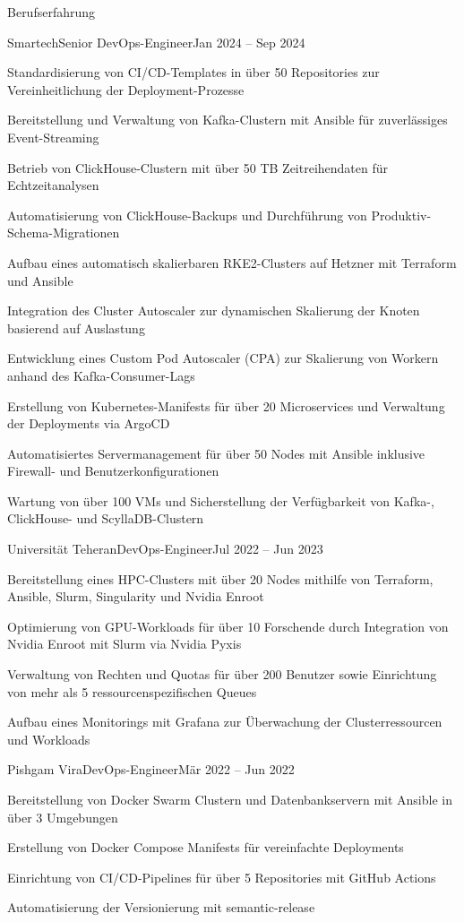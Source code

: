 \documentclass[]{main}
\begin{document}
\begin{section}{Berufserfahrung}
 \begin{subsection}{Smartech}{Senior DevOps-Engineer}{Jan 2024 -- Sep 2024}{}
     \item Standardisierung von CI/CD-Templates in über 50 Repositories zur Vereinheitlichung der Deployment-Prozesse
     \item Bereitstellung und Verwaltung von Kafka-Clustern mit Ansible für zuverlässiges Event-Streaming
     \item Betrieb von ClickHouse-Clustern mit über 50 TB Zeitreihendaten für Echtzeitanalysen
     \item Automatisierung von ClickHouse-Backups und Durchführung von Produktiv-Schema-Migrationen
     \item Aufbau eines automatisch skalierbaren RKE2-Clusters auf Hetzner mit Terraform und Ansible
     \item Integration des Cluster Autoscaler zur dynamischen Skalierung der Knoten basierend auf Auslastung
     \item Entwicklung eines Custom Pod Autoscaler (CPA) zur Skalierung von Workern anhand des Kafka-Consumer-Lags
     \item Erstellung von Kubernetes-Manifests für über 20 Microservices und Verwaltung der Deployments via ArgoCD
     \item Automatisiertes Servermanagement für über 50 Nodes mit Ansible inklusive Firewall- und Benutzerkonfigurationen
     \item Wartung von über 100 VMs und Sicherstellung der Verfügbarkeit von Kafka-, ClickHouse- und ScyllaDB-Clustern
 \end{subsection}

 \begin{subsection}{Universität Teheran}{DevOps-Engineer}{Jul 2022 -- Jun 2023}{}
     \item Bereitstellung eines HPC-Clusters mit über 20 Nodes mithilfe von Terraform, Ansible, Slurm, Singularity und Nvidia Enroot
     \item Optimierung von GPU-Workloads für über 10 Forschende durch Integration von Nvidia Enroot mit Slurm via Nvidia Pyxis
     \item Verwaltung von Rechten und Quotas für über 200 Benutzer sowie Einrichtung von mehr als 5 ressourcenspezifischen Queues
     \item Aufbau eines Monitorings mit Grafana zur Überwachung der Clusterressourcen und Workloads
 \end{subsection}

 \begin{subsection}{Pishgam Vira}{DevOps-Engineer}{Mär 2022 -- Jun 2022}{}
     \item Bereitstellung von Docker Swarm Clustern und Datenbankservern mit Ansible in über 3 Umgebungen
     \item Erstellung von Docker Compose Manifests für vereinfachte Deployments
     \item Einrichtung von CI/CD-Pipelines für über 5 Repositories mit GitHub Actions
     \item Automatisierung der Versionierung mit semantic-release
 \end{subsection}


\end{section}
\end{document}
